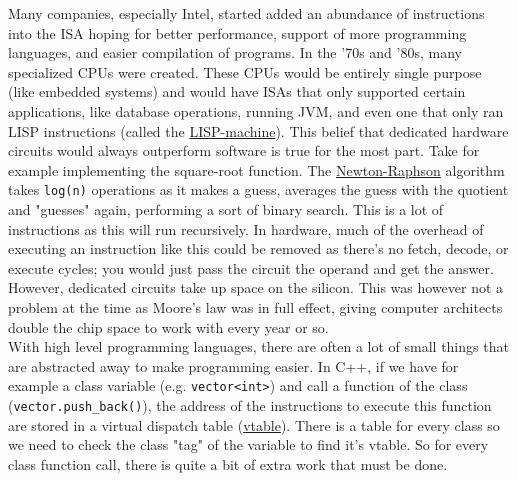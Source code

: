 \documentclass[10pt]{article}
\begin{document}
\newline
Many companies, especially Intel, started added an abundance of instructions into the ISA hoping for better performance, support of more programming languages, and easier compilation of programs. In the '70s and '80s, many specialized CPUs were created. These CPUs would be entirely single purpose (like embedded systems) and would have ISAs that only supported certain applications, like database operations, running JVM, and even one that only ran LISP instructions (called the \href{https://en.wikipedia.org/wiki/Lisp_machine}{LISP-machine}). This belief that dedicated hardware circuits would always outperform software is true for the most part. Take for example implementing the square-root function. The \href{https://en.wikipedia.org/wiki/Newton\%27s_method}{Newton-Raphson} algorithm takes \texttt{log(n)} operations as it makes a guess, averages the guess with the quotient and "guesses" again, performing a sort of binary search. This is a lot of instructions as this will run recursively. In hardware, much of the overhead of executing an instruction like this could be removed as there's no fetch, decode, or execute cycles; you would just pass the circuit the operand and get the answer. However, dedicated circuits take up space on the silicon. This was however not a problem at the time as Moore's law was in full effect, giving computer architects double the chip space to work with every year or so.\\
\newline
With high level programming languages, there are often a lot of small things that are abstracted away to make programming easier. In C++, if we have for example a class variable (e.g. \texttt{vector<int>}) and call a function of the class (\texttt{vector.push\_back()}), the address of the instructions to execute this function are stored in a virtual dispatch table (\href{https://pabloariasal.github.io/2017/06/10/understanding-virtual-tables/}{vtable}). There is a table for every class so we need to check the class "tag" of the variable to find it's vtable. So for every class function call, there is quite a bit of extra work that must be done.\\
\end{document}
